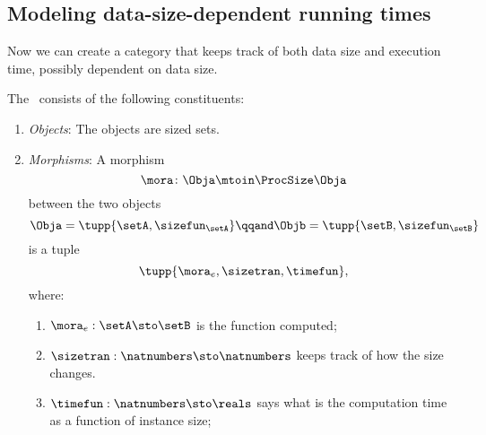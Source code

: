 \subsection{Modeling data-size-dependent running times}

Now we can create a category that keeps track of both data size and execution time, possibly dependent on data size.
\begin{definition}
    \label{def:ProcSizeTime}
    The ~\ProcSizeTime consists of the following constituents:
    \begin{enumerate}
        \item \emph{Objects}: The objects are sized sets.
        \item \emph{Morphisms}: A morphism
              \begin{equation}
                  \mora \colon \Obja \mtoin\ProcSize \Obja
              \end{equation}
              between the two objects
              \begin{equation}
                  \Obja = \tupp{\setA, \sizefun_{\setA}}
                  \qqand
                  \Objb = \tupp{\setB, \sizefun_{\setB}}
              \end{equation}
              is a tuple
              \begin{equation}
                  \tupp{\mora_e, \sizetran, \timefun },
              \end{equation}
              where:
              \begin{enumerate}
                  \item $\mora_e : \setA \sto \setB$ is the function computed;
                  \item $\sizetran: \natnumbers \sto \natnumbers$ keeps track of how the size changes.
                  \item $\timefun: \natnumbers \sto \reals$ says what is the computation time as a function of instance size;
              \end{enumerate}


\end{enumerate}
\end{definition}
